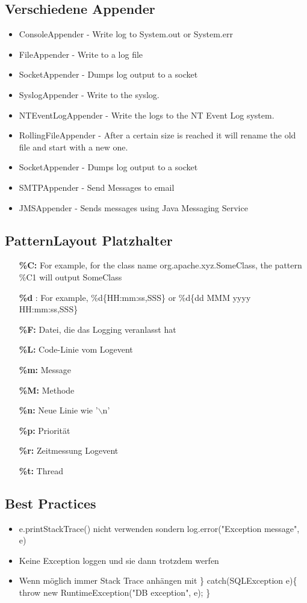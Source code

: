 \documentclass[a4paper,10pt]{article}
\newcommand{\Bold}[1]{\textbf{#1}} %
\begin{document}
\subsection{Verschiedene Appender}
\begin{itemize}
\item ConsoleAppender - Write log to System.out or System.err
\item FileAppender - Write to a log file
\item SocketAppender - Dumps log output to a socket
\item SyslogAppender - Write to the syslog.
\item NTEventLogAppender - Write the logs to the NT Event Log system.
\item RollingFileAppender - After a certain size is reached it will rename the old file and start with a new one.
\item SocketAppender - Dumps log output to a socket
\item SMTPAppender - Send Messages to email
\item JMSAppender - Sends messages using Java Messaging Service
\end{itemize}

\subsection{PatternLayout Platzhalter}
\begin{itemize}
\item[\Bold{\%C:}] For example, for the class name org.apache.xyz.SomeClass, the pattern \%C{1} will output SomeClass
\item[\Bold{\%d}]: For example, \%d\{HH:mm:ss,SSS\} or \%d\{dd MMM yyyy HH:mm:ss,SSS\}
\item[\Bold{\%F:}] Datei, die das Logging veranlasst hat
\item[\Bold{\%L:}] Code-Linie vom Logevent
\item[\Bold{\%m:}] Message
\item[\Bold{\%M:}] Methode
\item[\Bold{\%n:}] Neue Linie wie '$\backslash$n'
\item[\Bold{\%p:}] Priorität
\item[\Bold{\%r:}] Zeitmessung Logevent
\item[\Bold{\%t:}] Thread
\end{itemize}

\subsection{Best Practices} 
\begin{itemize}
\item e.printStackTrace() nicht verwenden sondern log.error("Exception message", e)
\item Keine Exception loggen und sie dann trotzdem werfen
\item Wenn möglich immer Stack Trace anhängen mit \} catch(SQLException e)\{ 
throw new RuntimeException("DB exception", e); \}
\end{itemize}
\end{document}
